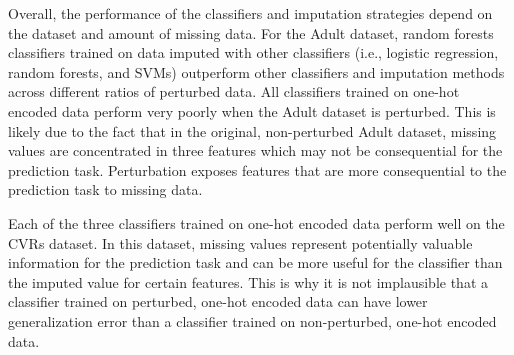 \documentclass[10pt,twocolumn,letterpaper]{article}
\begin{document}
Overall, the performance of the classifiers and imputation strategies depend on the dataset and amount of missing data. For the Adult dataset, random forests classifiers trained on data imputed with other classifiers (i.e., logistic regression, random forests, and SVMs) outperform other classifiers and imputation methods across different ratios of perturbed data. All classifiers trained on one-hot encoded data perform very poorly when the Adult dataset is perturbed. This is likely due to the fact that in the original, non-perturbed Adult dataset, missing values are concentrated in three features which may not be consequential for the prediction task. Perturbation exposes features that are more consequential to the prediction task to missing data. 

Each of the three classifiers trained on one-hot encoded data perform well on the CVRs dataset. In this dataset, missing values represent potentially valuable information for the prediction task and can be more useful for the classifier than the imputed value for certain features. This is why it is not implausible that a classifier trained on perturbed, one-hot encoded data can have lower generalization error than a classifier trained on non-perturbed, one-hot encoded data. 
\end{document}
